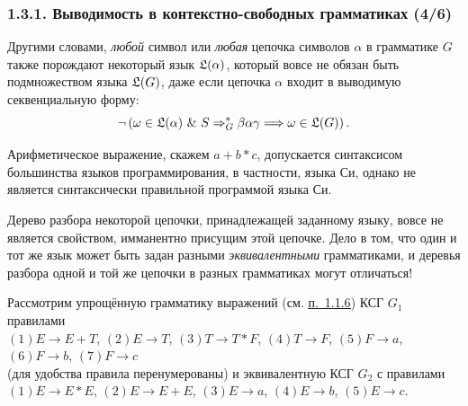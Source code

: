 \documentclass[mathserif,12pt,aspectratio=169]{beamer}
\def\emразделенной{\em разделенной}
\def\em#1{\it\color{blue}#1}
\let\Impl\Longrightarrow
\def\And{\operatorname{\,\&\,}}
\def\Not{\neg}
\def\DMref#1#2{{\color{blue}\underline{\hyperlink{#2}{#1}}}}
\begin{document}
\begin{frame}
\frametitle{1.3.1. Выводимость в контекстно-свободных грамматиках (4/6)}
\begin{remark}       
Другими словами, {\em любой} символ или 
{\em любая} цепочка символов $\alpha$ в грамматике $G$ также порождают 
некоторый язык $\frak{L}(\alpha)$, который вовсе не обязан 
быть подмножеством языка $\frak{L}(G)$, даже если цепочка $\alpha$ 
входит в выводимую секвенциальную форму:
$$ \Not\left( \omega\in\frak{L}(\alpha) \And S\Rightarrow_G^*\beta\alpha\gamma 
\Impl \omega\in\frak{L}(G)\right) .$$ 
\end{remark}
\begin{example}
Арифметическое выражение, скажем $a+b*c$, допускается синтаксисом
большинства языков программирования, в частности, языка Си,
однако не является синтаксически правильной программой языка Си.  
\end{example}

\smallskip
Дерево разбора некоторой цепочки, принадлежащей заданному языку, вовсе 
не является свойством, имманентно присущим этой цепочке. Дело в том, 
что один и тот же язык может быть задан разными {\em эквивалентными} грамматиками, 
и деревья разбора одной и той же цепочки в разных грамматиках могут отличаться!
\begin{example}
Рассмотрим упрощённую грамматику выражений (см. \DMref{п.~1.1.6}{1.1.6.}) КСГ $G_1$ правилами\\
$(1)E\rightarrow E+T$,
$(2)E\rightarrow T$,
$(3)T\rightarrow T*F$,
$(4)T\rightarrow F$,
$(5)F\rightarrow a$,
$(6)F\rightarrow b$,
$(7)F\rightarrow c$\\
(для удобства правила перенумерованы) и эквивалентную КСГ
$G_2$ с правилами\\
$(1)E\rightarrow E*E$,
$(2)E\rightarrow E+E$,
$(3)E\rightarrow a$,
$(4)E\rightarrow b$,
$(5)E\rightarrow c$.

\end{example}
   

\end{frame}
\end{document}
